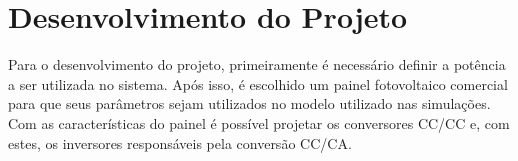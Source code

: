 \documentclass[
	12pt,				%
	openany,
	onseside,
	a4paper,			%
	english,			%
	french,				%
	spanish,			%
	brazil,				%
	]{abntex2}
\begin{document}


 




\chapter{Desenvolvimento do Projeto}  \label{cap:project}

Para o desenvolvimento do projeto, primeiramente é necessário definir a potência a ser utilizada no sistema. Após isso, é escolhido um painel fotovoltaico comercial para que seus parâmetros sejam utilizados no modelo utilizado nas simulações. Com as características do painel é possível projetar os conversores CC/CC e, com estes, os inversores responsáveis pela conversão CC/CA.
\end{document}
